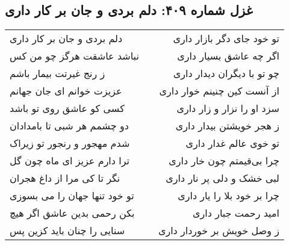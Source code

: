 \begin{center}
\section*{غزل شماره ۴۰۹: دلم بردی و جان بر کار داری}
\label{sec:409}
\begin{longtable}{l p{0.5cm} r}
دلم بردی و جان بر کار داری
&&
تو خود جای دگر بازار داری
\\
نباشد عاشقت هرگز چو من کس
&&
اگر چه عاشق بسیار داری
\\
ز رنج غیرتت بیمار باشم
&&
چو تو با دیگران دیدار داری
\\
عزیزت خوانم ای جان جهانم
&&
از آنست کین چنینم خوار داری
\\
کسی کو عاشق روی تو باشد
&&
سزد او را نزار و زار داری
\\
دو چشمم هر شبی تا بامدادان
&&
ز هجر خویشتن بیدار داری
\\
شدم مهجور و رنجور تو زیراک
&&
تو خوی عالم غدار داری
\\
ترا دارم عزیز ای ماه چون گل
&&
چرا بی‌قیمتم چون خار داری
\\
نگر تا کی مرا از داغ هجران
&&
لبی خشک و دلی پر نار داری
\\
تو خود تنها جهان را می بسوزی
&&
چرا بر خود بلا را یار داری
\\
بکن رحمی بدین عاشق اگر هیچ
&&
امید رحمت جبار داری
\\
سنایی را چنان باید کزین پس
&&
ز وصل خویش بر خوردار داری
\\
\end{longtable}
\end{center}

